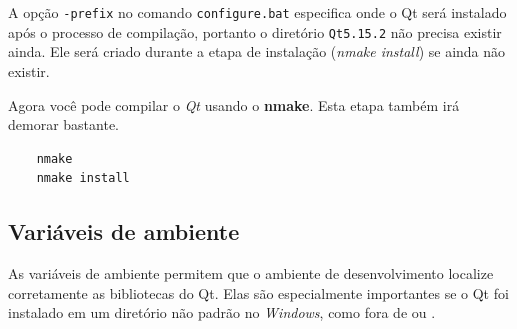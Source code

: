 \documentclass[a4paper,11pt]{article}
\newcommand{\qt}{\textit{Qt}}
\newcommand{\windows}{\textit{Windows}}
\begin{document}
A opção {\tt -prefix} no comando {\tt configure.bat} especifica onde o Qt será instalado após o processo de compilação, portanto o diretório {\tt Qt5.15.2} não precisa existir ainda. Ele será criado durante a etapa de instalação (\textit{nmake install}) se ainda não existir.

Agora você pode compilar o \qt{} usando o \textbf{nmake}.
Esta etapa também irá demorar bastante.

\begin{mdframed}
\begin{verbatim}	
	nmake
	nmake install
\end{verbatim}
\end{mdframed}


\subsection{Variáveis de ambiente}

As variáveis de ambiente permitem que o ambiente de desenvolvimento localize corretamente as bibliotecas do Qt. Elas são especialmente importantes se o Qt foi instalado em um diretório não padrão no \windows{}, como fora de  ou .
\end{document}
